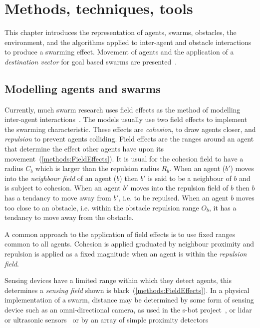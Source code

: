 \chapter{Methods, techniques, tools}\label{chapter:methods}
This chapter introduces the representation of agents, swarms, obstacles, the environment, and the algorithms applied to inter-agent and obstacle interactions to produce a swarming effect. Movement of agents and the application of a \textit{destination vector} for goal based swarms are presented~\cite{MP:10}. 

\section{Modelling agents and swarms}
Currently, much swarm research uses field effects as the method of modelling inter-agent interactions~\cite{BAF:06, BAFVM:06, BM:09, APZDAMC:09, GP:02, GP:04, GP:04a, GP:05, GP:11, MYP:09}. The models usually use two field effects to implement the swarming characteristic. These effects are \textit{cohesion}, to draw agents closer, and \textit{repulsion} to prevent agents colliding. Field effects are the ranges around an agent that determine the effect other agents have upon its movement~(\autoref{methods:FieldEffects}). It is usual for the cohesion field to have a radius $C_b$ which is larger than the repulsion radius $R_b$. When an agent ($b'$) moves into the \textit{neighbour field} of an agent ($b$) then $b'$ is said to be a neighbour of $b$ and is subject to cohesion. When an agent $b'$ moves into the repulsion field of $b$ then $b$ has a tendancy to move away from $b'$, i.e. to be repulsed. When an agent $b$ moves too close to an obstacle, i.e. within the obstacle repulsion range $O_b$, it has a tendancy to move away from the obstacle. 

A common approach to the application of field effects is to use fixed ranges common to all agents. Cohesion is applied graduated by neighbour proximity and repulsion is applied as a fixed magnitude when an agent is within the \textit{repulsion field}. 

Sensing devices have a limited range within which they detect agents, this determines a \textit{sensing field} shown is black~(\autoref{methods:FieldEffects}). In a physical implementation of a swarm, distance may be determined by some form of sensing device such as an omni-directional camera, as used in the s-bot project~\cite{HR:ND,MFGAB:03,MIN:07}, or lidar~\cite{LJLYP:15} or ultrasonic sensors~\cite{BC:15} or by an array of simple proximity detectors~\cite{HWN:11}  

